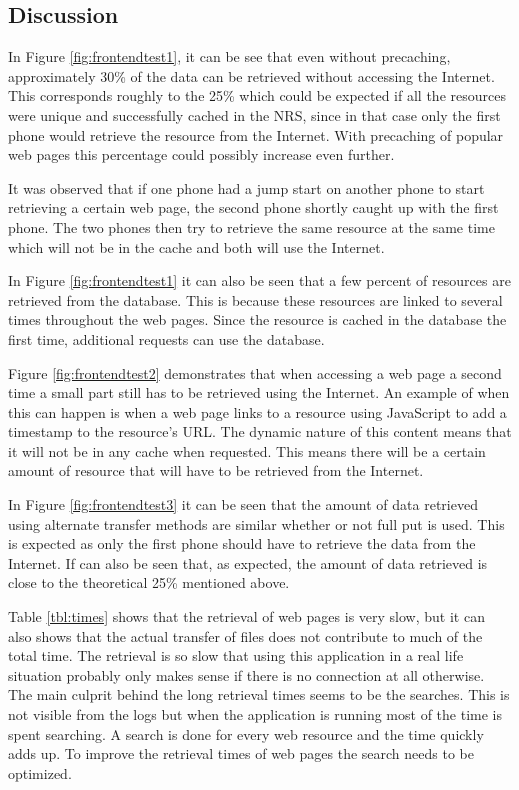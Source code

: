 \subsection{Discussion}

In Figure \ref{fig:frontendtest1}, it can be see that even without precaching, approximately 30\% of the data can be retrieved without accessing the Internet. This corresponds roughly to the 25\% which could be expected if all the resources were unique and successfully cached in the NRS, since in that case only the first phone would retrieve the resource from the Internet. With precaching of popular web pages this percentage could possibly increase even further.

It was observed that if one phone had a jump start on another phone to start retrieving a certain web page, the second phone shortly caught up with the first phone. The two phones then try to retrieve the same resource at the same time which will not be in the cache and both will use the Internet.

In Figure \ref{fig:frontendtest1} it can also be seen that a few percent of resources are retrieved from the database. This is because these resources are linked to several times throughout the web pages. Since the resource is cached in the database the first time, additional requests can use the database.

Figure \ref{fig:frontendtest2} demonstrates that when accessing a web page a second time a small part still has to be retrieved using the Internet. An example of when this can happen is when a web page links to a resource using JavaScript to add a timestamp to the resource's URL. The dynamic nature of this content means that it will not be in any cache when requested. This means there will be a certain amount of resource that will have to be retrieved from the Internet.

In Figure \ref{fig:frontendtest3} it can be seen that the amount of data retrieved using alternate transfer methods are similar whether or not full put is used. This is expected as only the first phone should have to retrieve the data from the Internet. If can also be seen that, as expected, the amount of data retrieved is close to the theoretical 25\% mentioned above.

Table \ref{tbl:times} shows that the retrieval of web pages is very slow, but it can also shows that the actual transfer of files does not contribute to much of the total time. The retrieval is so slow that using this application in a real life situation probably only makes sense if there is no connection at all otherwise. The main culprit behind the long retrieval times seems to be the searches. This is not visible from the logs but when the application is running most of the time is spent searching. A search is done for every web resource and the time quickly adds up. To improve the retrieval times of web pages the search needs to be optimized.

